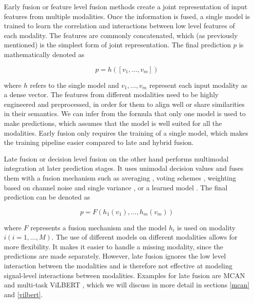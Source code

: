 \documentclass{article}
\begin{document}
Early fusion or feature level fusion methods create a joint representation of input features from multiple modalities. Once the information is fused, a single model is trained to learn the correlation and interactions between low level features of each modality. The features are commonly concatenated, which (as previously mentioned) is the simplest form of joint representation. The final prediction $p$ is mathematically denoted as

\begin{equation}
p = h([v_1, \dots , v_m])
\end{equation}

where $h$ refers to the single model and $ v_1, \dots , v_m$ represent each input modality as a dense vector. The features from different modalities need to be highly engineered and preprocessed, in order for them to align well or share similarities in their semantics. We can infer from the formula that only one model is used to make predictions, which assumes that the model is well suited for all the modalities. Early fusion only requires the training of a single model, which makes the training pipeline easier compared to late and hybrid fusion.

Late fusion or decision level fusion on the other hand performs multimodal integration at later prediction stages. It uses unimodal decision values and fuses them with a fusion mechanism such as averaging \citep{shutova2016black}, voting schemes \citep{morvant2014vote}, weighting based on channel noise \citep{potamianos2003noise} and single variance \citep{evangelopoulos2013variance}, or a learned model \citep{glodek2011learned, ramirez2011learned}. The final prediction can be denoted as

\begin{equation}
p = F(h_1(v_1), \dots , h_m(v_m))
\end{equation}

where $F$ represents a fusion mechanism and the model $h_i$ is used on modality $ i (i = 1, \dots , M)$. The use of different models on different modalities allows for more flexibility. It makes it easier to handle a missing modality, since the predictions are made separately. However, late fusion ignores the low level interaction between the modalities and is therefore not effective at modeling signal-level interactions between modalities. Examples for late fusion are MCAN \citep{yu2019mcan} and multi-task ViLBERT \citep{lu2020multitask}, which we will discuss in more detail in sections \ref{mcan} and \ref{vilbert}.
\end{document}
